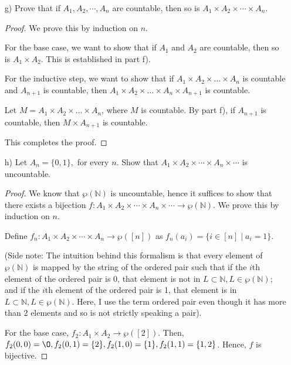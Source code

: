 \documentclass[11pt]{article}
\newcommand{\bbN}{\mathbb{N}}
\renewcommand{\emptyset}{\O}
\theoremstyle{definition}
\numberwithin{equation}{subsection}
\begin{document}
\begin{enumerate}
\begin{enumerate}
\begin{proof}
Therefore, $h$ is injective and this completes the proof.

\renewcommand\qedsymbol{QED}
\end{proof}

  \item[g)] Prove that if $A_1,A_2,\cdots, A_n$ are countable, then so is $A_1\times A_2\times \cdots\times A_n.$

\begin{proof}
We prove this by induction on $n$.

For the base case, we want to show that if $A_1$ and $A_2$ are countable, then so is $A_1 \times A_2$. This is established in part f).

For the inductive step, we want to show that if $A_1 \times A_2 \times \dots \times A_n$ is countable and $A_{n+1}$ is countable, then $A_1 \times A_2 \times \dots \times A_n \times A_{n+1}$ is countable.

Let $M = A_1 \times A_2 \times \dots \times A_n$, where $M$ is countable. By part f), if $A_{n+1}$ is countable, then $M \times A_{n+1}$ is countable.

This completes the proof.

\renewcommand\qedsymbol{QED}
\end{proof}

  \item[h)] Let $A_n=\{0,1\},$ for every $n.$ Show that $A_1\times A_2\times\cdots\times A_n\times\cdots$ is uncountable.

\begin{proof}
We know that $\wp(\bbN)$ is uncountable, hence it suffices to show that there exists a bijection $f \colon A_1\times A_2\times\cdots\times A_n\times\cdots \rightarrow \wp(\bbN)$. We prove this by induction on $n$.

Define $f_n \colon  A_1\times A_2\times\cdots\times A_n \rightarrow \wp([n])$ as $f_n(a_i) = \{i \in [n] \mid a_i = 1 \}$.

(Side note: The intuition behind this formalism is that every element of $\wp(\bbN)$ is mapped by the string of the ordered pair such that if the $i$th element of the ordered pair is 0, that element is not in $L \subset \bbN, L \in \wp(\bbN)$; and if the $i$th element of the ordered pair is 1, that element is in $L \subset \bbN, L \in \wp(\bbN)$. Here, I use the term ordered pair even though it has more than 2 elements and so is not strictly speaking a pair).

For the base case, $f_2\colon A_1 \times A_2 \rightarrow \wp([2])$. Then, $f_2(0,0) = \emptyset, f_2(0,1) = \{2\}, f_2(1,0)=\{1\}, f_2(1,1) = \{1,2\}$. Hence, $f$ is bijective.


\end{proof}
\end{enumerate}
\end{enumerate}
\end{document}
